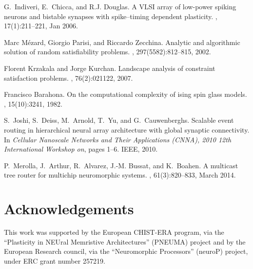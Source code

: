 \documentclass[10pt]{article}
\begin{document}
\begin{thebibliography}{10}
G.~Indiveri, E.~Chicca, and R.J. Douglas.
\newblock A {VLSI} array of low-power spiking neurons and bistable synapses
  with spike--timing dependent plasticity.
, 17(1):211--221, Jan
  2006.

Marc M{\'e}zard, Giorgio Parisi, and Riccardo Zecchina.
\newblock Analytic and algorithmic solution of random satisfiability problems.
, 297(5582):812--815, 2002.

Florent Krzakala and Jorge Kurchan.
\newblock Landscape analysis of constraint satisfaction problems.
, 76(2):021122, 2007.

Francisco Barahona.
\newblock On the computational complexity of ising spin glass models.
, 15(10):3241,
  1982.

S.~Joshi, S.~Deiss, M.~Arnold, T.~Yu, and G.~Cauwenberghs.
\newblock Scalable event routing in hierarchical neural array architecture with
  global synaptic connectivity.
\newblock In {\em Cellular Nanoscale Networks and Their Applications (CNNA),
  2010 12th International Workshop on}, pages 1--6. IEEE, 2010.

P.~Merolla, J.~Arthur, R.~Alvarez, J.-M. Bussat, and K.~Boahen.
\newblock A multicast tree router for multichip neuromorphic systems.
,
  61(3):820--833, March 2014.

\end{thebibliography}

\section*{Acknowledgements}
\label{sec:acknowledgements}

This work was supported by the European CHIST-ERA program, via the ``Plasticity in NEUral Memristive Architectures'' (PNEUMA) project and by the European Research council, via the ``Neuromorphic Processors'' (neuroP) project, under ERC grant number 257219.
\end{document}
